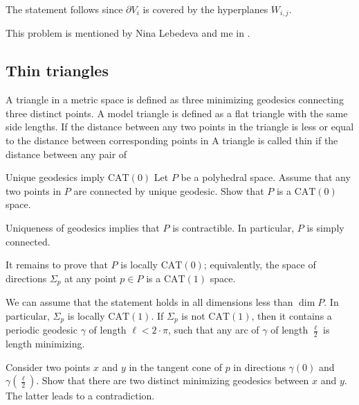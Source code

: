 The statement follows since $\partial V_i$ is covered by the hyperplanes $W_{i,j}$.
\qeds

This problem is mentioned 
by Nina Lebedeva and me in \cite{lebedeva-petrunin}.














\subsection*{Thin triangles\easy}

A triangle in a metric space is defined as three minimizing  geodesics connecting three distinct points.
A model triangle is defined as a flat triangle with the same side lengths.
If the distance between any two points in the triangle is less or equal to the distance between corresponding points in 
A triangle is called thin if the distance between any pair of


\begin{pr}{\easy}{Unique geodesics imply $\mathrm{CAT}(0)$}\label{Unique geodesics imply CAT}
Let $P$ be a polyhedral space.
Assume that any two points in $P$ 
are connected by unique geodesic.
Show that $P$ is a $\mathrm{CAT}(0)$ space.
\end{pr}


Uniqueness of geodesics implies that $P$ is contractible.
In particular, $P$ is simply connected.

It remains to prove that $P$ is locally $\mathrm{CAT}(0)$;
equivalently, the space of directions $\Sigma_p$
at any point $p\in P$ is  a $\mathrm{CAT}(1)$ space.

We can assume that the statement holds in all dimensions less than $\dim P$. 
In particular, $\Sigma_p$ is locally $\mathrm{CAT}(1)$.
If $\Sigma_p$ is not $\mathrm{CAT}(1)$,
then it contains a periodic geodesic $\gamma$ of length $\ell<2\cdot\pi$,
such that any arc of $\gamma$ of length $\tfrac\ell2$ is length minimizing.

Consider two points $x$ and $y$
in the tangent cone of $p$
in directions $\gamma(0)$ and $\gamma(\tfrac\ell2)$.
Show that there are two distinct minimizing geodesics between $x$ and $y$.
The latter leads to a contradiction.
\qeds


